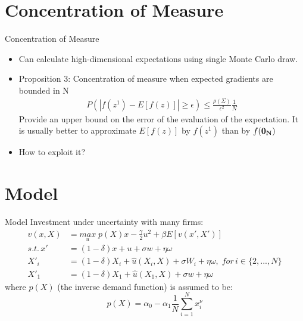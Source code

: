 \documentclass[dvipsnames,mathserif]{beamer}
\begin{document}
{\section{Concentration of Measure}
\begin{frame}{Concentration of Measure}
    \begin{itemize}
        \item Can calculate high-dimensional expectations using single Monte Carlo draw.\\ 
        \vspace{0.1cm}
        \item Proposition 3: Concentration of measure when expected gradients are bounded in N
        \begin{align*}
        P(|f(z^1) - E[f(z)]| \geq \epsilon) \leq \frac{\rho(\Sigma)}{\epsilon^2}\frac{1}{N}
        \end{align*}
        Provide an upper bound on the error of the evaluation of the expectation. 
        It is usually better to approximate $E [f (z)]$ by $f (z^1)$ than by $f(\bf{0}_N)$
        \vspace{0.2cm}
        \item How to exploit it?
    \end{itemize}
\end{frame}

\section{Model}
\begin{frame}{Model}
Investment under uncertainty with many firms:\\
    \begin{align*}
    v(x,X) & = \underset{u}{max}\;{p(X)x - \frac{\gamma}{2}u^2 + \beta E[v(x',X')]}\\
    s.t. \, x'&= (1-\delta)x + u + \sigma w + \eta \omega\\
    X'_{i} &= (1-\delta)X_{i} + \hat{u}(X_{i},X) + \sigma W_{i} + \eta \omega, \; for \, i\in\{2,...,N\}\\
    X'_1 &= (1-\delta)X_1 + \hat{u}(X_1,X) + \sigma w + \eta \omega
    \end{align*}
    where $p(X)$ (the inverse demand function) is assumed to be: \[p(X) = \alpha_0 - \alpha_1\frac{1}{N}\sum_{i=1}^{N}x_i^{\nu}\]
\end{frame}

}
\end{document}
